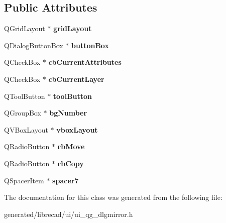 \subsection*{Public Attributes}
\begin{DoxyCompactItemize}
\item 
\hypertarget{classUi__QG__DlgMirror_af9ab17ca1ec8310fdf439fb79c2eeb59}{Q\-Grid\-Layout $\ast$ {\bfseries grid\-Layout}}\label{classUi__QG__DlgMirror_af9ab17ca1ec8310fdf439fb79c2eeb59}

\item 
\hypertarget{classUi__QG__DlgMirror_a7a38c6f621ccd505104732d96a70a520}{Q\-Dialog\-Button\-Box $\ast$ {\bfseries button\-Box}}\label{classUi__QG__DlgMirror_a7a38c6f621ccd505104732d96a70a520}

\item 
\hypertarget{classUi__QG__DlgMirror_a84dc86f98eab4b48a7f5f315ad6c398b}{Q\-Check\-Box $\ast$ {\bfseries cb\-Current\-Attributes}}\label{classUi__QG__DlgMirror_a84dc86f98eab4b48a7f5f315ad6c398b}

\item 
\hypertarget{classUi__QG__DlgMirror_ae5b9898b886a5631ff2c4c5a02e095a2}{Q\-Check\-Box $\ast$ {\bfseries cb\-Current\-Layer}}\label{classUi__QG__DlgMirror_ae5b9898b886a5631ff2c4c5a02e095a2}

\item 
\hypertarget{classUi__QG__DlgMirror_a4fd3a239774bc706a2c89eb66f5db450}{Q\-Tool\-Button $\ast$ {\bfseries tool\-Button}}\label{classUi__QG__DlgMirror_a4fd3a239774bc706a2c89eb66f5db450}

\item 
\hypertarget{classUi__QG__DlgMirror_aec314e03329ba126dbbf99874f1ace9b}{Q\-Group\-Box $\ast$ {\bfseries bg\-Number}}\label{classUi__QG__DlgMirror_aec314e03329ba126dbbf99874f1ace9b}

\item 
\hypertarget{classUi__QG__DlgMirror_aa6244776f3670f436010f9657f072dcf}{Q\-V\-Box\-Layout $\ast$ {\bfseries vbox\-Layout}}\label{classUi__QG__DlgMirror_aa6244776f3670f436010f9657f072dcf}

\item 
\hypertarget{classUi__QG__DlgMirror_afc0ebf1d0db9ed9bc2d41cffd12709a6}{Q\-Radio\-Button $\ast$ {\bfseries rb\-Move}}\label{classUi__QG__DlgMirror_afc0ebf1d0db9ed9bc2d41cffd12709a6}

\item 
\hypertarget{classUi__QG__DlgMirror_a8932e2cf55b30dcd78ee1d6412a13089}{Q\-Radio\-Button $\ast$ {\bfseries rb\-Copy}}\label{classUi__QG__DlgMirror_a8932e2cf55b30dcd78ee1d6412a13089}

\item 
\hypertarget{classUi__QG__DlgMirror_ab6158c4d34ada39afe71bb5e312b3d1d}{Q\-Spacer\-Item $\ast$ {\bfseries spacer7}}\label{classUi__QG__DlgMirror_ab6158c4d34ada39afe71bb5e312b3d1d}

\end{DoxyCompactItemize}


The documentation for this class was generated from the following file\-:\begin{DoxyCompactItemize}
\item 
generated/librecad/ui/ui\-\_\-qg\-\_\-dlgmirror.\-h\end{DoxyCompactItemize}
